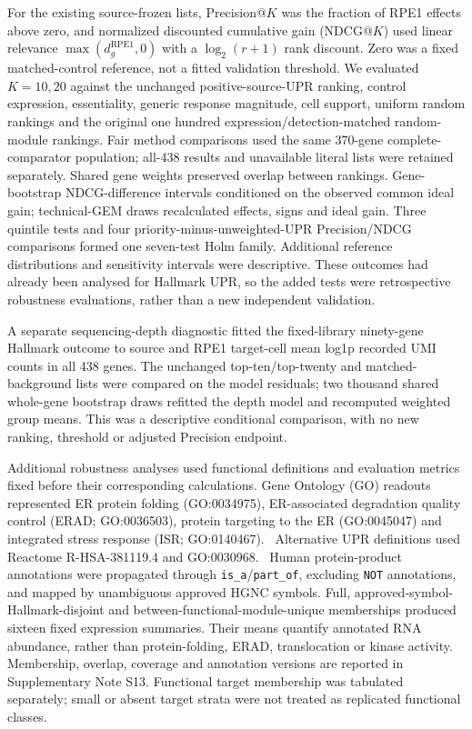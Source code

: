 \documentclass[a4paper,fleqn]{cas-sc}
\makeatletter
\DeclareRobustCommand{\rev}[1]{{\color{red}\def\@citecolor{black}\def\@linkcolor{red}\def\@urlcolor{red}#1}}
\let\unmarkedcite\cite
\renewcommand{\cite}[1]{{\color{black}\def\@citecolor{black}\unmarkedcite{#1}}}
\makeatother
\begin{document}
\rev{For the existing source-frozen lists, Precision@$K$ was the fraction of RPE1 effects above zero, and normalized discounted cumulative gain (NDCG@$K$) used linear relevance $\max(d_g^{\mathrm{RPE1}},0)$ with a $\log_2(r+1)$ rank discount.} \rev{Zero was a fixed matched-control reference, not a fitted validation threshold.} \rev{We evaluated $K=10,20$ against the unchanged positive-source-UPR ranking, control expression, essentiality, generic response magnitude, cell support, uniform random rankings and the original one hundred expression/detection-matched random-module rankings.} \rev{Fair method comparisons used the same 370-gene complete-comparator population; all-438 results and unavailable literal lists were retained separately.} \rev{Shared gene weights preserved overlap between rankings.} \rev{Gene-bootstrap NDCG-difference intervals conditioned on the observed common ideal gain; technical-GEM draws recalculated effects, signs and ideal gain.} \rev{Three quintile tests and four priority-minus-unweighted-UPR Precision/NDCG comparisons formed one seven-test Holm family.} \rev{Additional reference distributions and sensitivity intervals were descriptive.} \rev{These outcomes had already been analysed for Hallmark UPR, so the added tests were retrospective robustness evaluations, rather than a new independent validation.}

\rev{A separate sequencing-depth diagnostic fitted the fixed-library ninety-gene Hallmark outcome to source and RPE1 target-cell mean log1p recorded UMI counts in all 438 genes.} \rev{The unchanged top-ten/top-twenty and matched-background lists were compared on the model residuals; two thousand shared whole-gene bootstrap draws refitted the depth model and recomputed weighted group means.} \rev{This was a descriptive conditional comparison, with no new ranking, threshold or adjusted Precision endpoint.}

\rev{Additional robustness analyses used functional definitions and evaluation metrics fixed before their corresponding calculations.} \rev{Gene Ontology (GO) readouts represented ER protein folding (GO:0034975), ER-associated degradation quality control (ERAD; GO:0036503), protein targeting to the ER (GO:0045047) and integrated stress response (ISR; GO:0140467).~\cite{go2000,go2026}} \rev{Alternative UPR definitions used Reactome R-HSA-381119.4 and GO:0030968.~\cite{reactome2024}} \rev{Human protein-product annotations were propagated through \texttt{is\_a}/\texttt{part\_of}, excluding \texttt{NOT} annotations, and mapped by unambiguous approved HGNC symbols.} \rev{Full, approved-symbol-Hallmark-disjoint and between-functional-module-unique memberships produced sixteen fixed expression summaries.} \rev{Their means quantify annotated RNA abundance, rather than protein-folding, ERAD, translocation or kinase activity.} \rev{Membership, overlap, coverage and annotation versions are reported in Supplementary Note S13.} \rev{Functional target membership was tabulated separately; small or absent target strata were not treated as replicated functional classes.}
\end{document}
